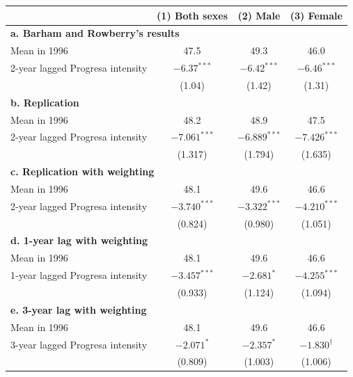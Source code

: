 \begin{tabular}{lccc}
\hline
 & \textbf{(1) Both sexes} & \textbf{(2) Male} & \textbf{(3) Female} \\
\hline

\multicolumn{4}{l}{\textbf{a. Barham and Rowberry’s results}} \\
Mean in 1996 & 47.5 & 49.3 & 46.0 \\
2-year lagged Progresa intensity & $-6.37^{***}$ & $-6.42^{***}$ & $-6.46^{***}$ \\
 & (1.04) & (1.42) & (1.31) \\[6pt]

\multicolumn{4}{l}{\textbf{b. Replication}} \\
Mean in 1996 & 48.2 & 48.9 & 47.5 \\
2-year lagged Progresa intensity & $-7.061^{***}$ & $-6.889^{***}$ & $-7.426^{***}$ \\
 & (1.317) & (1.794) & (1.635) \\[6pt]

\multicolumn{4}{l}{\textbf{c. Replication with weighting}} \\
Mean in 1996 & 48.1 & 49.6 & 46.6 \\
2-year lagged Progresa intensity & $-3.740^{***}$ & $-3.322^{***}$ & $-4.210^{***}$ \\
 & (0.824) & (0.980) & (1.051) \\[6pt]

\multicolumn{4}{l}{\textbf{d. 1-year lag with weighting}} \\
Mean in 1996 & 48.1 & 49.6 & 46.6 \\
1-year lagged Progresa intensity & $-3.457^{***}$ & $-2.681^{*}$ & $-4.255^{***}$ \\
 & (0.933) & (1.124) & (1.094) \\[6pt]

\multicolumn{4}{l}{\textbf{e. 3-year lag with weighting}} \\
Mean in 1996 & 48.1 & 49.6 & 46.6 \\
3-year lagged Progresa intensity & $-2.071^{*}$ & $-2.357^{*}$ & $-1.830^{\dagger}$ \\
 & (0.809) & (1.003) & (1.006) \\
\hline
\end{tabular}